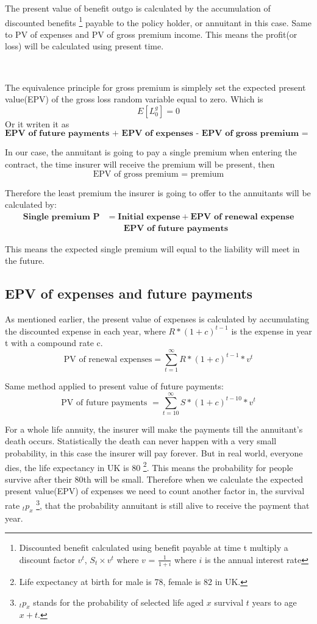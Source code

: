 \documentclass{report}
\begin{document}
The present value of benefit outgo is calculated by the accumulation of discounted benefits \footnote{Discounted benefit calculated using benefit payable at time t multiply a discount factor $v^t$, $S_t \times v^t$ where $v$ = $\frac{1}{1+i}$ where $i$ is the annual interest rate} payable to the policy holder, or annuitant in this case. Same to PV of expenses and PV of gross premium income. This means the profit(or loss) will be calculated using present time.

 \



The equivalence principle for gross premium is simplely set the expected present value(EPV) of the gross loss random variable equal to zero. Which is
\[
E[L_0^g] = 0
\]
Or it writen it as
\[
\textbf{EPV\ of\ future\ payments + EPV\ of\ expenses - EPV\ of\ gross\ premium = 0}
\]

In our case, the annuitant is going to pay a single premium when entering the contract, the time insurer will receive the premium will be present, then 
\[
\text{EPV of gross premium = premium}
\]

Therefore the least premium the insurer is going to offer to the annuitants will be calculated by:
\begin{align}
\textbf{Single premium P} &= \textbf{Initial expense} + \textbf{EPV of renewal expense}  \nonumber \\
 &\qquad {} \textbf{EPV of future payments}
\end{align}


This means the expected single premium will equal to the liability will meet in the future.




\subsection{EPV of expenses and future payments}

As mentioned earlier, the present value of expenses is calculated by accumulating the discounted expense in each year, where  $R *(1 + c )^{t-1}$ is the expense in year t with a compound rate c.
\[
\text{PV of renewal expenses} = \sum_{t=1}^{\infty} R *(1 + c )^{t-1} *v^t
\]

Same method applied to present value of future payments:
\[
\text{PV of future payments }= \sum_{t=10}^{\infty} S * (1 + c )^{t-10} * v^t 
\]

For a whole life annuity, the insurer will make the payments till the annuitant's death occurs. Statistically the death can never happen with a very small probability, in this case the insurer will pay forever. But in real world, everyone dies, the life expectancy in UK is 80 \footnote{Life expectancy at birth for male is 78, female is 82 in UK.}. This means the probability for people survive after their 80th will be small. Therefore when we calculate the expected present value(EPV) of expenses we need to count another factor in, the survival rate $_tp_x$ \footnote{$_tp_x$ stands for the probability of selected life aged $x$ survival $t$ years to age $x+t$.}, that the probability annuitant is still alive to receive the payment that year.
\end{document}
